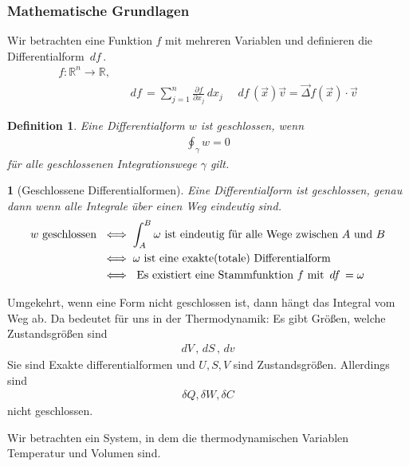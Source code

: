 \documentclass[11pt]{article}
\theoremstyle{plain}
\newtheorem*{definition}{Definition}
\theoremstyle{mytheoremstyle}
\newtheorem*{theorem*}{}
\newcommand{\R}{\mathbb{R}}
\newcommand{\pd}[2]{\frac{\partial #1 }{\partial #2}}
\renewcommand{\d}[1]{\,d#1\,}
\begin{document}
\subsubsection*{Mathematische Grundlagen}
Wir betrachten eine Funktion $f$ mit mehreren Variablen und definieren 
die Differentialform $\d{f}$.
%
\begin{align*}
  f: \R^n \to \R, &&   \\
                  && \d{f} = \sum_{j=1}^{n} \pd{f}{x_j} \d{x_j} \quad 
  \d{f}(\vec{x})\vec{v}  = \vec{\Delta} f(\vec{x}) \cdot \vec{v}
\end{align*}
%
\begin{definition}
  Eine Differentialform $w$ ist geschlossen, wenn
  \begin{align*}
    \oint_{\gamma}^{} w = 0  \end{align*}
    f\"ur alle geschlossenen Integrationswege $\gamma$ gilt.
\end{definition}
\begin{theorem*}[Geschlossene Differentialformen]
  Eine Differentialform ist geschlossen, genau dann wenn alle Integrale
  über einen Weg eindeutig sind.
  \begin{align*}
    w \text{ geschlossen } &  \iff \int_{A}^{B} \omega \text{ ist eindeutig f\"ur
    alle Wege zwischen $A$ und $B$} \\
    & \iff \omega \text{ ist eine exakte(totale) Differentialform} \\
    & \iff \text{ Es existiert eine Stammfunktion $f$ mit $ \d{f} = \omega$}
  \end{align*}
\end{theorem*}
  Umgekehrt, wenn eine Form nicht geschlossen ist, dann h\"angt das Integral vom Weg ab.
  Da bedeutet f\"ur uns in der Thermodynamik:
  Es gibt Gr\"o\ss{}en, welche Zustandsgr\"o\ss{}en sind
  \begin{align*}
    \d{V}, \d{S}, \d{v}
  \end{align*}
  Sie sind Exakte differentialformen und $U, S, V$ sind Zustandsgr\"o\ss{}en.
  Allerdings sind
  \begin{align*}
    \delta Q, \delta W, \delta C
  \end{align*}
  nicht geschlossen.

  Wir betrachten ein System, in dem die thermodynamischen Variablen 
  Temperatur und Volumen sind.
\end{document}
